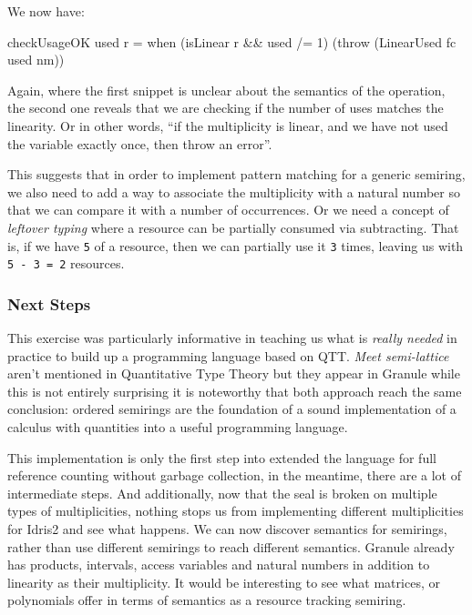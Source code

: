 \documentclass[
]{article}
\newenvironment{Shaded}{}{}
\newcommand{\DataTypeTok}[1]{\textcolor[rgb]{0.56,0.13,0.00}{#1}}
\newcommand{\DecValTok}[1]{\textcolor[rgb]{0.25,0.63,0.44}{#1}}
\newcommand{\NormalTok}[1]{#1}
\newcommand{\OperatorTok}[1]{\textcolor[rgb]{0.40,0.40,0.40}{#1}}
\newcommand{\OtherTok}[1]{\textcolor[rgb]{0.00,0.44,0.13}{#1}}
\begin{document}
We now have:

\begin{Shaded}
\begin{Highlighting}[]
\NormalTok{checkUsageOK used r }\OtherTok{=}\NormalTok{ when (isLinear r }\OperatorTok{\&\&}\NormalTok{ used }\OperatorTok{/=} \DecValTok{1}\NormalTok{)}
\NormalTok{                           (throw (}\DataTypeTok{LinearUsed}\NormalTok{ fc used nm))}
\end{Highlighting}
\end{Shaded}

Again, where the first snippet is unclear about the semantics of the
operation, the second one reveals that we are checking if the number of
uses matches the linearity. Or in other words, ``if the multiplicity is
linear, and we have not used the variable exactly once, then throw an
error''.

This suggests that in order to implement pattern matching for a generic
semiring, we also need to add a way to associate the multiplicity with a
natural number so that we can compare it with a number of occurrences.
Or we need a concept of \emph{leftover typing} where a resource can be
partially consumed via subtracting. That is, if we have \texttt{5} of a
resource, then we can partially use it \texttt{3} times, leaving us with
\texttt{5\ -\ 3\ =\ 2} resources.

\hypertarget{next-steps}{%
\subsubsection{Next Steps}\label{next-steps}}

This exercise was particularly informative in teaching us what is
\emph{really needed} in practice to build up a programming language
based on QTT. \emph{Meet semi-lattice} aren't mentioned in Quantitative
Type Theory\cite{qtt} but they appear in Granule \cite{granule} while
this is not entirely surprising it is noteworthy that both approach
reach the same conclusion: ordered semirings are the foundation of a
sound implementation of a calculus with quantities into a useful
programming language.

This implementation is only the first step into extended the language
for full reference counting without garbage collection, in the meantime,
there are a lot of intermediate steps. And additionally, now that the
seal is broken on multiple types of multiplicities, nothing stops us
from implementing different multiplicities for Idris2 and see what
happens. We can now discover semantics for semirings, rather than use
different semirings to reach different semantics. Granule already has
products, intervals, access variables and natural numbers in addition to
linearity as their multiplicity. It would be interesting to see what
matrices, or polynomials offer in terms of semantics as a resource
tracking semiring.
\end{document}
